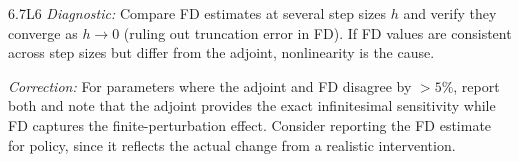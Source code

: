 \begin{solution}{6.7}{L6}
\textit{Diagnostic:} Compare FD estimates at several step sizes $h$ and
verify they converge as $h \to 0$ (ruling out truncation error in FD).
If FD values are consistent across step sizes but differ from the adjoint,
nonlinearity is the cause.

\textit{Correction:} For parameters where the adjoint and FD disagree
by $>5\%$, report both and note that the adjoint provides the exact
infinitesimal sensitivity while FD captures the finite-perturbation effect.
Consider reporting the FD estimate for policy, since it reflects the
actual change from a realistic intervention.


\end{solution}

